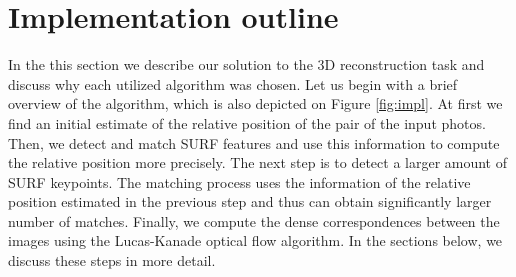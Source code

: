
\section{Implementation outline}
\label{sec:impl_outline}
In the this section we describe our solution to the 3D reconstruction task and discuss why each utilized algorithm was chosen.
Let us begin with a brief overview of the algorithm, which is also depicted on Figure \ref{fig:impl}.
At first we find an initial estimate of the relative position of the pair of the input photos.
Then, we detect and match SURF features and use this information to compute the relative position more precisely. 
The next step is to detect a larger amount of SURF keypoints. 
The matching process uses the information of the relative position estimated in the previous step and thus can obtain significantly larger number of matches.
Finally, we compute the dense correspondences between the images using the Lucas-Kanade optical flow algorithm.
In the sections below, we discuss these steps in more detail. 

